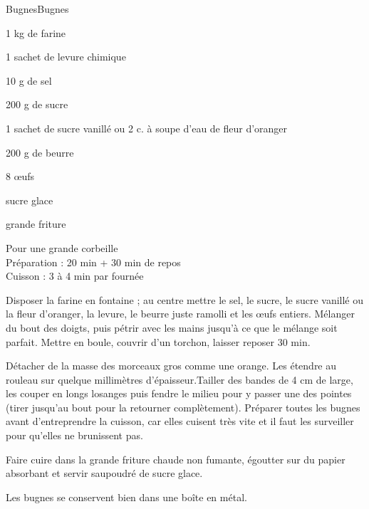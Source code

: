 \begin{recette}{Bugnes}{Bugnes}

\begin{ingredients}
1 kg de farine\par
1 sachet de levure chimique\par
10 g de sel\par
200 g de sucre\par
1 sachet de sucre vanillé ou 2 c. à soupe d'eau de fleur d'oranger\par
200 g de beurre\par
8 œufs\par
sucre glace\par
grande friture\par
\end{ingredients}

\begin{infos}
Pour une grande corbeille\\
Préparation : 20 min + 30 min de repos\\
Cuisson : 3 à 4 min par fournée\\
\end{infos}

\begin{etapes}
\item Disposer la farine en fontaine ; au centre mettre le sel, le sucre, le sucre vanillé ou la fleur d'oranger, la levure, le beurre juste ramolli et les œufs entiers. Mélanger du bout des doigts, puis pétrir avec les mains jusqu'à ce que le mélange soit parfait. Mettre en boule, couvrir d'un torchon, laisser reposer 30 min.
\item Détacher de la masse des morceaux gros comme une orange. Les étendre au rouleau sur quelque millimètres d'épaisseur.Tailler des bandes de 4 cm de large, les couper en longs losanges puis fendre le milieu pour y passer une des pointes (tirer jusqu'au bout pour la retourner complètement). Préparer toutes les bugnes avant d'entreprendre la cuisson, car elles cuisent très vite et il faut les surveiller pour qu'elles ne brunissent pas.
\item Faire cuire dans la grande friture chaude non fumante, égoutter sur du papier absorbant et servir saupoudré de sucre glace.
\end{etapes}

\begin{conseils}
Les bugnes se conservent bien dans une boîte en métal.
\end{conseils}

\end{recette}